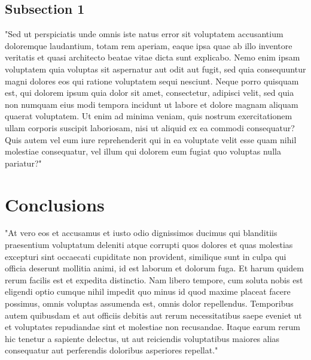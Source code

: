 \documentclass[12pt]{article}
\begin{document}
\subsection{Subsection 1}
"Sed ut perspiciatis unde omnis iste natus error sit voluptatem accusantium doloremque laudantium, totam rem aperiam, eaque ipsa quae ab illo inventore veritatis et quasi architecto beatae vitae dicta sunt explicabo. Nemo enim ipsam voluptatem quia voluptas sit aspernatur aut odit aut fugit, sed quia consequuntur magni dolores eos qui ratione voluptatem sequi nesciunt. Neque porro quisquam est, qui dolorem ipsum quia dolor sit amet, consectetur, adipisci velit, sed quia non numquam eius modi tempora incidunt ut labore et dolore magnam aliquam quaerat voluptatem. Ut enim ad minima veniam, quis nostrum exercitationem ullam corporis suscipit laboriosam, nisi ut aliquid ex ea commodi consequatur? Quis autem vel eum iure reprehenderit qui in ea voluptate velit esse quam nihil molestiae consequatur, vel illum qui dolorem eum fugiat quo voluptas nulla pariatur?"

\section{Conclusions}
"At vero eos et accusamus et iusto odio dignissimos ducimus qui blanditiis praesentium voluptatum deleniti atque corrupti quos dolores et quas molestias excepturi sint occaecati cupiditate non provident, similique sunt in culpa qui officia deserunt mollitia animi, id est laborum et dolorum fuga. Et harum quidem rerum facilis est et expedita distinctio. Nam libero tempore, cum soluta nobis est eligendi optio cumque nihil impedit quo minus id quod maxime placeat facere possimus, omnis voluptas assumenda est, omnis dolor repellendus. Temporibus autem quibusdam et aut officiis debitis aut rerum necessitatibus saepe eveniet ut et voluptates repudiandae sint et molestiae non recusandae. Itaque earum rerum hic tenetur a sapiente delectus, ut aut reiciendis voluptatibus maiores alias consequatur aut perferendis doloribus asperiores repellat."



\end{document}
